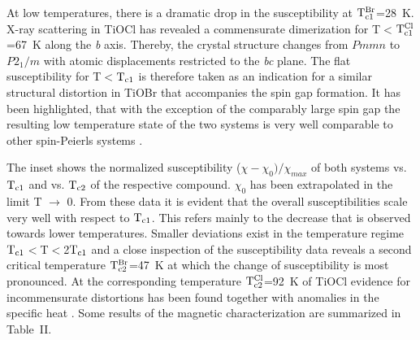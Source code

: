 \documentclass[prb,preprint,draft,amsmath,showpacs]{revtex4}
\begin{document}
At low temperatures, there is a dramatic drop in the susceptibility at $\rm
T_{c1}^{Br}$=28~K. X-ray scattering in TiOCl has revealed a commensurate dimerization
for T$<$$\rm T_{c1}^{Cl}$=67~K along the \emph{b} axis.\cite{lee03,shaz04} Thereby, the
crystal structure changes from $Pmmn$ to $P2_{1}/m$ with atomic displacements restricted
to the \emph{bc} plane. The flat susceptibility for T$<$$\rm T_{c1}$ is therefore taken
as an indication for a similar structural distortion in TiOBr that accompanies the spin
gap formation. It has been highlighted, that with the exception of the comparably large
spin gap the resulting low temperature state of the two systems is very well comparable
to other spin-Peierls systems \cite{lemmens03,caimi04}.

The inset shows the normalized susceptibility ($\chi-\chi_0)/\chi_{max}$ of both systems
vs. $\rm T_{c1}$ and vs. $\rm T_{c2}$ of the respective compound. $\chi_0$ has been
extrapolated in the limit T $\rightarrow$ 0. From these data it is evident that the
overall susceptibilities scale very well with respect to $\rm T_{c1}$. This refers
mainly to the decrease that is observed towards lower temperatures. Smaller deviations
exist in the temperature regime $\rm T_{c1}$$<$T$<$2$\rm T_{c1}$ and a close inspection
of the susceptibility data reveals a second critical temperature $\rm T_{c2}^{Br}$=47~K
at which the change of susceptibility is most pronounced. At the corresponding
temperature $\rm T_{c2}^{Cl}$=92~K of TiOCl evidence for incommensurate distortions has
been found together with anomalies in the specific heat \cite{lee03}. Some results of
the magnetic characterization are summarized in Table~II.
\end{document}
